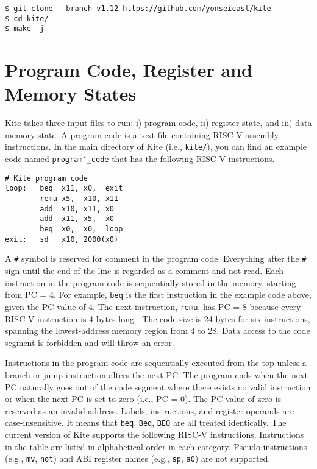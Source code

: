 \documentclass[10pt]{article}
\begin{document}
\begin{Verbatim}[frame=single,fontsize=\small]
$ git clone --branch v1.12 https://github.com/yonseicasl/kite
$ cd kite/
$ make -j
\end{Verbatim}


\section{Program Code, Register and Memory States} \label{sec:inputs}
Kite takes three input files to run: i) program code, ii) register state, and iii) data memory state.
A program code is a text file containing RISC-V assembly instructions.
In the main directory of Kite (i.e., {\tt\small kite/}), you can find an example code named {\tt\small program\char`_code} that has the following RISC-V instructions.

\begin{Verbatim}[frame=single,fontsize=\small]
# Kite program code
loop:   beq  x11, x0,  exit
        remu x5,  x10, x11
        add  x10, x11, x0
        add  x11, x5,  x0
        beq  x0,  x0,  loop
exit:   sd   x10, 2000(x0)
\end{Verbatim}

A {\tt\small \#} symbol is reserved for comment in the program code.
Everything after the {\tt\small \#} sign until the end of the line is regarded as a comment and not read.
Each instruction in the program code is sequentially stored in the memory, starting from PC = 4.
For example, {\tt\small beq} is the first instruction in the example code above, given the PC value of 4.
The next instruction, {\tt\small remu}, has PC = 8 because every RISC-V instruction is 4 bytes long \cite{waterman_riscv2019}.
The code size is 24 bytes for six instructions, spanning the lowest-address memory region from 4 to 28.
Data access to the code segment is forbidden and will throw an error.

Instructions in the program code are sequentially executed from the top unless a branch or jump instruction alters the next PC.
The program ends when the next PC naturally goes out of the code segment where there exists no valid instruction or when the next PC is set to zero (i.e., PC = 0).
The PC value of zero is reserved as an invalid address.
Labels, instructions, and register operands are case-insensitive.
It means that {\tt\small beq}, {\tt\small Beq}, {\tt\small BEQ} are all treated identically.
The current version of Kite supports the following RISC-V instructions.
Instructions in the table are listed in alphabetical order in each category.
Pseudo instructions (e.g., {\tt\small mv}, {\tt\small not}) and ABI register names (e.g., {\tt\small sp}, {\tt\small a0}) are not supported.
\end{document}
